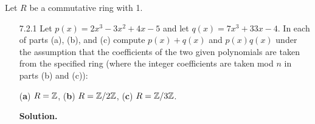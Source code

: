 
Let $R$ be a commutative ring with 1.
\begin{enumerate}
   \item[7.2.1]   Let $p(x) = 2x^3 - 3x^2 + 4x - 5$ and let
                  $q(x) = 7x^3 + 33x - 4$. In each of parts (a), (b), and (c)
                  compute $p(x) + q(x)$ and $p(x)q(x)$ under the assumption that
                  the coefficients of the two given polynomials are taken from
                  the specified ring (where the integer coefficients are taken
                  mod $n$ in parts (b) and (c)):
                  
                  (\textbf{a}) $R = \mathbb{Z}$, \quad (\textbf{b}) $R = \mathbb{Z}/2\mathbb{Z}$, \quad
                  (\textbf{c}) $R = \mathbb{Z}/3\mathbb{Z}$.

      \textbf{Solution.}
   

\end{enumerate}
